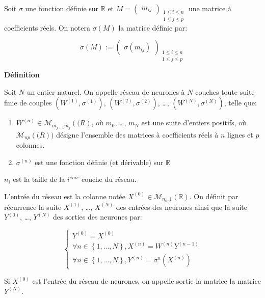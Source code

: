 \documentclass[11pt]{article}
\begin{document}
Soit $\sigma$ une fonction définie sur $\mathbb{R}$ et
$M=\begin{pmatrix}m_{ij}
\end{pmatrix}_{\substack{1\leq i\leq n\\1\leq j\leq p }}$ une matrice à
coefficients réels. On notera $\sigma(M)$ la matrice définie par:

\begin{equation}
\sigma(M):=\begin{pmatrix}
\sigma(m_{ij})
\end{pmatrix}_{\substack{1\leq i\leq n\\1\leq j\leq p }}
\end{equation}

\textbf{Définition}

Soit $N$ un entier naturel. On appelle réseau de neurones à $N$ couches toute
suite finie de couples $(W^{(1)},\sigma^{(1)})$, $(W^{(2)},\sigma^{(2)})$, \ldots{},
$(W^{(N)},\sigma^{(N)})$, telle que:

\begin{enumerate}
\item $W^{(n)}\in\mathcal{M}_{m_{j+1}m_{j}}(\mathbb(R)$, où $m_{0}$, \ldots{}, $m_N$ est
une suite d'entiers positifs, où $\mathcal{M}_{np}(\mathbb(R))$ désigne
l'ensemble des matrices à coefficients réels à $n$ lignes et $p$ colonnes.
\item $\sigma^{(n)}$ est une fonction définie (et dérivable) sur $\mathbb{R}$
\end{enumerate}

$n_{i}$ est la taille de la $i^{eme}$ couche du réseau.

L'entrée du réseau est la colonne notée
$X^{(0)}\in\mathcal{M}_{n_{0},1}(\mathbb{R})$. On définit par récurrence la
suite $X^{(1)}$, \ldots{}, $X^{(N)}$ des entrées des neurones ainsi que la suite
$Y^{(0)}$, \ldots{}, $Y^{(N)}$ des sorties des neurones par:

\begin{equation}
\begin{cases}
Y^{(0)}=X^{(0)}\\
\forall n\in \left\{1,...,N\right\}, X^{(n)}=W^{(n)}Y^{(n-1)}\\
\forall n\in \left\{1,...,N\right\}, Y^{(n)}=\sigma^{n}(X^{(n)})
\end{cases}
\end{equation}

Si $X^{(0)}$ est l'entrée du réseau de neurones, on appelle sortie la matrice la
matrice $Y^{(N)}$.
\end{document}
